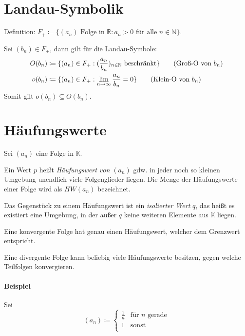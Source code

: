     \section{Landau-Symbolik}
        Definition: $ F _ + \coloneqq \{ (a _ n) \text{ Folge in } \mathbb{R} : a _ n > 0 \text{ für alle } n \in \mathbb{N} \} $.

        Sei $ (b _ n) \in F _ + $, dann gilt für die Landau-Symbole:
        \begin{align*}
            O(b _ n) &\coloneqq \{ (a _ n) \in F _ + : (\frac{a _ n}{b _ n}) _ { n \in \mathbb{N} } \text{ beschränkt} \} \tag{Groß-O von $ b _ n $} \\
            o(b _ n) &\coloneqq \{ (a _ n) \in F _ + : \lim_{n \to \infty} \frac{a _ n}{b _ n} = 0 \} \tag{Klein-O von $ b _ n $} \\
        \end{align*}
        Somit gilt $ o(b _ n) \subseteq O(b _ n) $.

    \section{Häufungswerte}
        Sei $ (a _ n) $ eine Folge in $ \mathbb{K} $.

        Ein Wert $ p $ heißt \textit{Häufungswert von $ (a _ n) $} gdw. in jeder noch so kleinen Umgebung unendlich viele Folgenglieder liegen. Die Menge der Häufungswerte einer Folge wird als $ HW(a _ n) $ bezeichnet.

        Das Gegenstück zu einem Häufungswert ist ein \textit{isolierter Wert} $ q $, das heißt es existiert eine Umgebung, in der außer $ q $ keine weiteren Elemente aus $ \mathbb{K} $ liegen.

        Eine konvergente Folge hat genau einen Häufungswert, welcher dem Grenzwert entspricht.

        Eine divergente Folge kann beliebig viele Häufungswerte besitzen, gegen welche Teilfolgen konvergieren.

        \paragraph{Beispiel}
            Sei
            \begin{equation*}
                (a _ n) \coloneqq
                \begin{cases}
                    \frac{1}{n} & \text{für } n \text{ gerade} \\
                    1           & \text{sonst} \\
                \end{cases}
            \end{equation*}

